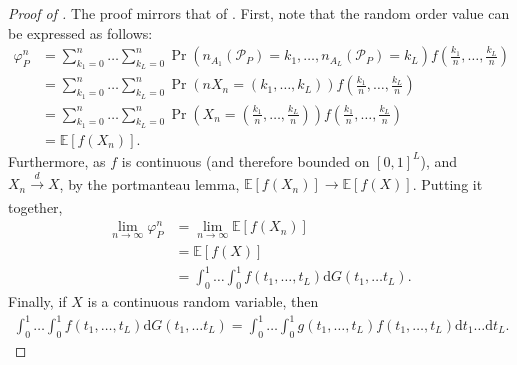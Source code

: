 \documentclass[a4paper]{article}
\newcommand{\dt}{\mathrm{d}t}
\newcommand{\dG}{\mathrm{d}G}
\newcommand{\E}{\mathbb{E}}
\begin{document}
\begin{proof}[Proof of ]
    The proof mirrors that of .
    First, note that the random order value can be expressed as follows:
    \begin{align*}
        \varphi_P^n &= \sum_{k_1=0}^n \dots \sum_{k_L=0}^n \Pr(n_{A_1}(\mathcal{P}_P) = k_1, \dots, n_{A_L}(\mathcal{P}_P) = k_L) f\left(\frac{k_1}{n}, \dots, \frac{k_L}{n}\right) \\
        &= \sum_{k_1=0}^n \dots \sum_{k_L=0}^n \Pr(n X_n = (k_1, \dots, k_L)) f\left(\frac{k_1}{n}, \dots, \frac{k_L}{n}\right) \\
        &= \sum_{k_1=0}^n \dots \sum_{k_L=0}^n \Pr \left( X_n = \left(\frac{k_1}{n}, \dots, \frac{k_L}{n}\right) \right) f \left(\frac{k_1}{n}, \dots, \frac{k_L}{n}\right) \\
        &= \E[f(X_n)].
    \end{align*}
    Furthermore, as $f$ is continuous (and therefore bounded on $[0, 1]^L$), and $X_n \xrightarrow[]{d} X$, by the portmanteau lemma, $\E[f(X_n)] \to \E[f(X)]$.
    Putting it together,
    \begin{align*}
        \lim_{n \to \infty} \varphi_P^n &= \lim_{n \to \infty} \E[f(X_n)] \\
        &= \E[f(X)] \\
        &= \int_0^1 \dots \int_0^1 f(t_1, \dots, t_L) \dG(t_1, \dots t_L).
    \end{align*}
    Finally, if $X$ is a continuous random variable, then
    \begin{align*}
        \int_0^1 \dots \int_0^1 f(t_1, \dots, t_L) \dG(t_1, \dots t_L) = \int_0^1\dots \int_0^1 g(t_1, \dots, t_L) f(t_1, \dots, t_L) \dt_1 \dots \dt_L.
    \end{align*}
\end{proof}
\end{document}
